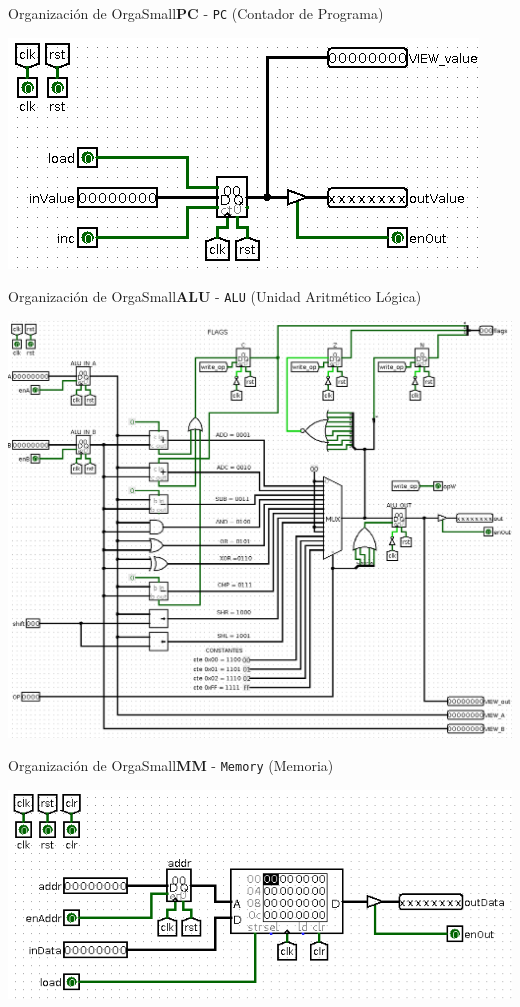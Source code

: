 \documentclass[aspectratio=169]{beamer}
\begin{document}
\begin{frame}[fragile]{Organización de OrgaSmall}{\textbf{PC} - \texttt{PC} (Contador de Programa)}
    \begin{center} \includegraphics[scale=0.3]{img/2_PC.png} \end{center}
\end{frame}

\begin{frame}[fragile,t]{Organización de OrgaSmall}{\textbf{ALU} - \texttt{ALU} (Unidad Aritmético Lógica)}
    \begin{center} \includegraphics[scale=0.22]{img/4_ALU.png} \end{center}
\end{frame}

\begin{frame}[fragile,t]{Organización de OrgaSmall}{\textbf{MM} - \texttt{Memory} (Memoria)}
    \begin{center} \includegraphics[scale=0.3]{img/5_Memory.png} \end{center}
\end{frame}
\end{document}
